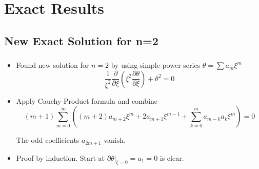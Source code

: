 \section{Exact Results}


\subsection{New Exact Solution for n=2}
\begin{frame}
	\frametitle{\insertsubsection}
	\begin{itemize}[<+->]
		\item Found new solution for $n=2$ by using simple power-series $\theta=\sum a_m\xi^m$
		\begin{equation}
			\frac{1}{\xi^2}\frac{\partial}{\partial\xi}\left(\xi^2\frac{\partial\theta}{\partial\xi}\right) +\theta^2 =0
		\end{equation}
		\item Apply Cauchy-Product formula and combine
		\begin{equation}
			(m+1)\sum\limits_{m=0}^\infty\left((m+2)a_{m+2}\xi^{m}+2a_{m+1}\xi^{m-1} + \sum\limits_{k=0}^m a_{m-k}a_k\xi^m\right) = 0
		\end{equation}
		\begin{theorem}
			The odd coefficients $a_{2m+1}$ vanish.
		\end{theorem}
		\item Proof by induction. Start at $\left.\partial\theta\right|_{\xi=0}=a_1=0$ is clear.
	\end{itemize}
\end{frame}


